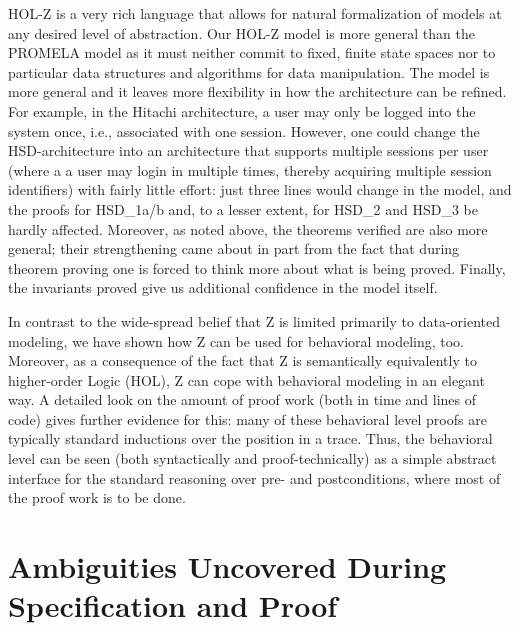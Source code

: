 \documentclass[a4paper,pdftex]{article}
\begin{document}
HOL-Z is a very rich language that allows for natural formalization of
models at any desired level of abstraction. Our HOL-Z model is more
general than the PROMELA model as it must neither commit to fixed,
finite state spaces nor to particular data structures and algorithms
for data manipulation.  The model is more general and it leaves more
flexibility in how the architecture can be refined. For example, in
the Hitachi architecture, a user may only be logged into the system
once, i.e., associated with one session.  However, one could change
the HSD-architecture into an architecture that supports multiple
sessions per user (where a a user may login in multiple times, thereby
acquiring multiple session identifiers) with fairly little effort:
just three lines would change in the model, and the proofs for
HSD\_1a/b and, to a lesser extent, for HSD\_2 and HSD\_3 be hardly
affected. Moreover, as noted above, the theorems verified are also
more general; their strengthening came about in part from the fact
that during theorem proving one is forced to think more about what is
being proved.  Finally, the invariants proved give us additional
confidence in the model itself.

In contrast to the wide-spread belief that Z is limited
primarily to data-oriented modeling, we have shown how Z can be
used for behavioral modeling, too. Moreover, as a consequence of the
fact that Z is semantically equivalently to higher-order Logic (HOL),
Z can cope with behavioral modeling in an elegant way.
A detailed look on the amount of proof work
(both in time and lines of code) gives further evidence for this: many of these
behavioral level proofs are typically standard inductions over the
position in a trace.  Thus, the behavioral level can be
seen (both syntactically and proof-technically) as a simple abstract
interface for the standard reasoning over pre- and postconditions,
where most of the proof work is to be done.

\clearpage{}

\appendix
\section{Ambiguities Uncovered During Specification and Proof}
\end{document}
